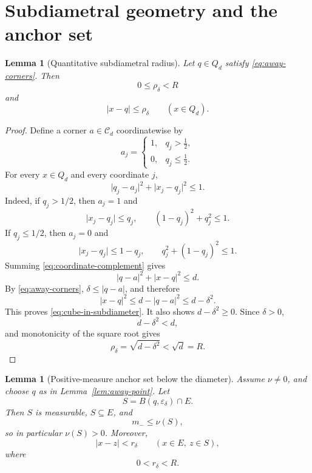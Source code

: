 \documentclass[11pt]{article}
\newtheorem{lemma}[theorem]{Lemma}
\theoremstyle{remark}
\newcommand{\Cube}{Q_d}
\newcommand{\Corners}{\mathcal C_d}
\begin{document}
\section{Subdiametral geometry and the anchor set}

\begin{lemma}[Quantitative subdiametral radius]                            \label{lem:subdiametral}
Let \(q\in\Cube\) satisfy \eqref{eq:away-corners}.  Then
\[
  0\leq\rho_\delta<R
\]
and
\begin{equation}
  \lvert x-q\rvert
  \leq
  \rho_\delta
  \qquad(x\in\Cube).                                                       \label{eq:cube-in-subdiameter}
\end{equation}
\end{lemma}

\begin{proof}
Define a corner \(a\in\Corners\) coordinatewise by
\[
  a_j
  =
  \begin{cases}
    1,&q_j>\frac12,\\
    0,&q_j\leq\frac12.
  \end{cases}
\]
For every \(x\in\Cube\) and every coordinate \(j\),
\begin{equation}
  \lvert q_j-a_j\rvert^2
  +
  \lvert x_j-q_j\rvert^2
  \leq1.                                                                  \label{eq:coordinate-complement}
\end{equation}
Indeed, if \(q_j>1/2\), then \(a_j=1\) and
\[
  \lvert x_j-q_j\rvert\leq q_j,
  \qquad
  (1-q_j)^2+q_j^2\leq1.
\]
If \(q_j\leq1/2\), then \(a_j=0\) and
\[
  \lvert x_j-q_j\rvert\leq1-q_j,
  \qquad
  q_j^2+(1-q_j)^2\leq1.
\]
Summing \eqref{eq:coordinate-complement} gives
\[
  \lvert q-a\rvert^2+\lvert x-q\rvert^2\leq d.
\]
By \eqref{eq:away-corners}, \(\delta\leq\lvert q-a\rvert\), and therefore
\[
  \lvert x-q\rvert^2
  \leq
  d-\lvert q-a\rvert^2
  \leq
  d-\delta^2.
\]
This proves \eqref{eq:cube-in-subdiameter}.  It also shows
\(d-\delta^2\geq0\).  Since \(\delta>0\),
\[
  d-\delta^2<d,
\]
and monotonicity of the square root gives
\[
  \rho_\delta=\sqrt{d-\delta^2}<\sqrt d=R.
\]
\end{proof}

\begin{lemma}[Positive-measure anchor set below the diameter]             \label{lem:anchor-set}
Assume \(\nu\neq0\), and choose \(q\) as in
Lemma~\ref{lem:away-point}.  Let
\[
  S=B(q,\varepsilon_\delta)\cap E.
\]
Then \(S\) is measurable, \(S\subseteq E\), and
\begin{equation}
  m_-
  \leq
  \nu(S),                                                                 \label{eq:anchor-mass-lower}
\end{equation}
so in particular \(\nu(S)>0\).  Moreover,
\begin{equation}
  \lvert x-z\rvert<r_\delta
  \qquad(x\in E,\ z\in S),                                                \label{eq:anchor-distance}
\end{equation}
where
\[
  0<r_\delta<R.
\]
\end{lemma}
\end{document}
